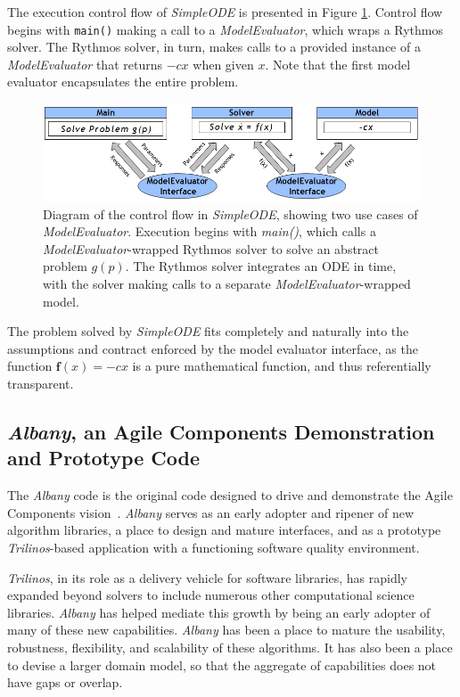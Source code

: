 \documentclass[pdf,ps2pdf,12pt,report]{SANDreport}
\theoremstyle{plain}
\theoremstyle{definition}
\theoremstyle{remark}
\numberwithin{equation}{section}
\begin{document}
The execution control flow of \emph{SimpleODE} is presented in Figure \ref{fig:SimpleODEInterface}.  Control flow begins with \verb"main()" making a call to a \emph{ModelEvaluator}, which wraps a Rythmos solver. The Rythmos solver, in turn, makes calls to a provided instance of a \emph{ModelEvaluator} that returns $-cx$ when given $x$. Note that the first model evaluator encapsulates the entire problem.

\begin{figure}[h!]
\begin{center}
	\includegraphics[width=\linewidth]{SimpleODEInterface}
 \end{center}
 \caption{Diagram of the control flow in \emph{SimpleODE}, showing two use cases of \emph{ModelEvaluator}. Execution begins with \emph{main()}, which calls a \emph{ModelEvaluator}-wrapped Rythmos solver to solve an abstract problem $g(p)$. The Rythmos solver integrates an ODE in time, with the solver making calls to a separate \emph{ModelEvaluator}-wrapped model.}
\label{fig:SimpleODEInterface}
\end{figure}

The problem solved by \emph{SimpleODE} fits completely and naturally into the assumptions and contract enforced by the model evaluator interface, as the function $\mathbf{f}(x) = -c x$ is a pure mathematical function, and thus referentially transparent.

\subsection{\emph{Albany}, an Agile Components Demonstration and Prototype Code} \label{sec:albany}

The \emph{Albany} code is the original code designed to drive and demonstrate the Agile Components vision~\cite{AlbanyWebPage:2011}. \emph{Albany} serves as an early adopter and ripener of new algorithm libraries, a place to design and mature interfaces, and as a prototype \emph{Trilinos}-based application with a functioning software quality environment.

\emph{Trilinos}, in its role as a delivery vehicle for software libraries, has rapidly expanded beyond solvers to include numerous other computational science libraries. \emph{Albany} has helped mediate this growth by being an early adopter of many of these new capabilities. \emph{Albany} has been a place to mature the usability, robustness, flexibility, and scalability of these algorithms. It has also been a place to devise a larger domain model, so that the aggregate of capabilities does not have gaps or overlap.
\end{document}
